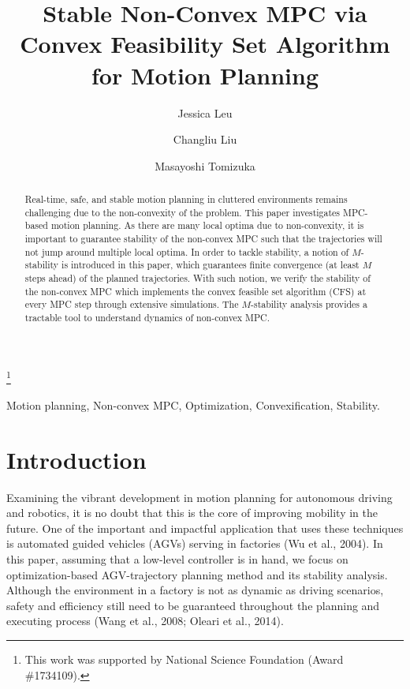 \documentclass{ifacconf}
\begin{document}
\begin{frontmatter}

\title{Stable Non-Convex MPC via Convex Feasibility Set Algorithm for Motion Planning} 

\thanks[footnoteinfo]{This work was supported by National Science Foundation (Award \#1734109).}

\author[First]{ Jessica Leu} 
\author[Second]{ Changliu Liu} 
\author[First]{ Masayoshi Tomizuka}

\address[First]{ University of California,
Berkeley, CA 94720 USA\\ \tt jess.leu24@berkeley.edu, tomizuka@me.berkeley.edu}
\address[Second]{ Stanford University, CA 94305 USA\\ \tt  changliuliu@stanford.edu}


\begin{abstract}                %
Real-time, safe, and stable motion planning in cluttered environments remains challenging due to the non-convexity of the problem. This paper investigates MPC-based motion planning. As there are many local optima due to non-convexity, it is important to guarantee stability of the non-convex MPC such that the trajectories will not jump around multiple local optima. In order to tackle stability, a notion of $M$-stability is introduced in this paper, which guarantees finite convergence (at least $M$ steps ahead) of the planned trajectories. With such notion, we verify the stability of the non-convex MPC which implements the convex feasible set algorithm (CFS) at every MPC step through extensive simulations. The $M$-stability analysis provides a tractable tool to understand dynamics of non-convex MPC.
 

\end{abstract}

\begin{keyword}
Motion planning, Non-convex MPC, Optimization, Convexification, Stability.
\end{keyword}

\end{frontmatter}

\section{Introduction}
Examining the vibrant development in motion planning for autonomous driving and robotics, it is no doubt that this is the core of improving mobility in the future. One of the important and impactful application that uses these techniques is automated guided vehicles (AGVs) serving in factories (Wu et al., 2004). In this paper, assuming that a low-level controller is in hand, we focus on optimization-based AGV-trajectory planning method and its stability analysis. Although the environment in a factory is not as dynamic as driving scenarios, safety and efficiency still need to be guaranteed throughout the planning and executing process (Wang et al., 2008; Oleari et al., 2014).
\end{document}
